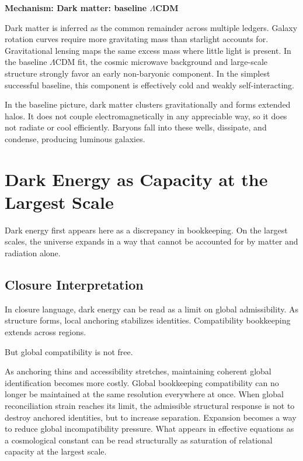 \documentclass[11pt,twoside,openright]{book}
\newenvironment{mechanismbox}[1]
  {\begin{framed}\noindent\textbf{Mechanism: #1}\par\medskip}
  {\end{framed}}
\begin{document}
\begin{mechanismbox}{Dark matter: baseline $\Lambda$CDM}

Dark matter is inferred as the common remainder across multiple ledgers. Galaxy rotation curves require more gravitating mass than starlight accounts for. Gravitational lensing maps the same excess mass where little light is present. In the baseline $\Lambda$CDM fit, the cosmic microwave background and large-scale structure strongly favor an early non-baryonic component. In the simplest successful baseline, this component is effectively cold and weakly self-interacting.

In the baseline picture, dark matter clusters gravitationally and forms extended halos. It does not couple electromagnetically in any appreciable way, so it does not radiate or cool efficiently. Baryons fall into these wells, dissipate, and condense, producing luminous galaxies.

\end{mechanismbox}
\chapter{Dark Energy as Capacity at the Largest Scale}

Dark energy first appears here as a discrepancy in bookkeeping. On the largest scales, the universe expands in a way that cannot be accounted for by matter and radiation alone.

\section*{Closure Interpretation}

In closure language, dark energy can be read as a limit on global admissibility. As structure forms, local anchoring stabilizes identities. Compatibility bookkeeping extends across regions.

But global compatibility is not free.

As anchoring thins and accessibility stretches, maintaining coherent global identification becomes more costly. Global bookkeeping compatibility can no longer be maintained at the same resolution everywhere at once. When global reconciliation strain reaches its limit, the admissible structural response is not to destroy anchored identities, but to increase separation. Expansion becomes a way to reduce global incompatibility pressure. What appears in effective equations as a cosmological constant can be read structurally as saturation of relational capacity at the largest scale.
\end{document}

